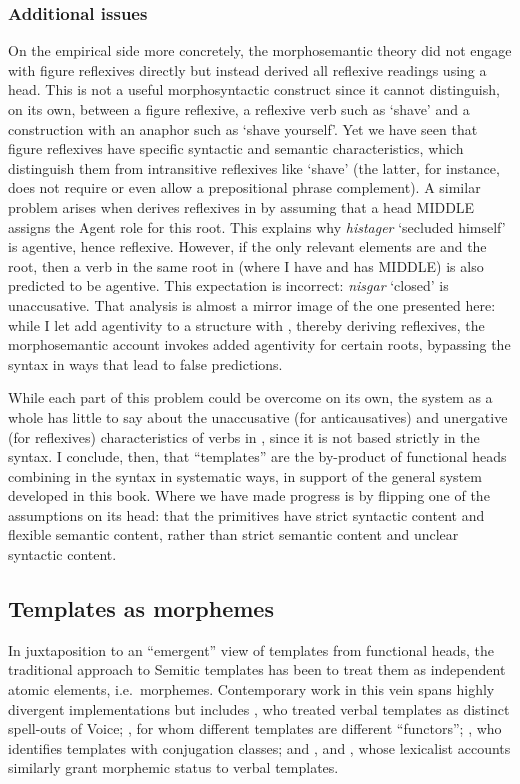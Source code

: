 		\subsubsection{Additional issues}
On the empirical side more concretely, the morphosemantic theory did not engage with figure reflexives directly but instead derived all reflexive readings using a  head. This is not a useful morphosyntactic construct since it cannot distinguish, on its own, between a figure reflexive, a reflexive verb such as `shave’ and a construction with an anaphor such as `shave yourself’. Yet we have seen that figure reflexives have specific syntactic and semantic characteristics, which distinguish them from intransitive reflexives like `shave’ (the latter, for instance, does not require or even allow a prepositional phrase complement). A similar problem arises when \citet[60]{doron03} derives reflexives in {\thit} by assuming that a head MIDDLE assigns the Agent role for this root. This explains why \emph{histager} `secluded himself' is agentive, hence reflexive. However, if the only relevant elements are {\vz} and the root, then a verb in the same root in {\tnif} (where I have {\vz} and \citealt{doron03} has MIDDLE) is also predicted to be agentive. This expectation is incorrect: \emph{nisgar} `closed' is unaccusative. That analysis is almost a mirror image of the one presented here: while I let {\va} add agentivity to a structure with \vz, thereby deriving reflexives, the morphosemantic account invokes added agentivity for certain roots, bypassing the syntax in ways that lead to false predictions.

While each part of this problem could be overcome on its own, the system as a whole has little to say about the unaccusative (for anticausatives) and unergative (for reflexives) characteristics of verbs in {\thit}, since it is not based strictly in the syntax. I conclude, then, that ``templates'' are the by-product of functional heads combining in the syntax in systematic ways, in support of the general system developed in this book. Where we have made progress is by flipping one of the assumptions on its head: that the primitives have strict syntactic content and flexible semantic content, rather than strict semantic content and unclear syntactic content.

	\subsection{Templates as morphemes} \label{vz:others:morph}
In juxtaposition to an ``emergent'' view of templates from functional heads, the traditional approach to Semitic templates has been to treat them as independent atomic elements, i.e.~morphemes. Contemporary work in this vein spans highly divergent implementations but includes \cite{arad03,arad05}, who treated verbal templates as distinct spell-outs of Voice; \cite{borer13oup}, for whom different templates are different ``functors''; \cite{aronoff94,aronoff07}, who identifies templates with conjugation classes; and \cite{reinhartsiloni05}, \cite{schwarzwald08} and \cite{laks11,laks14}, whose lexicalist accounts similarly grant morphemic status to verbal templates.

